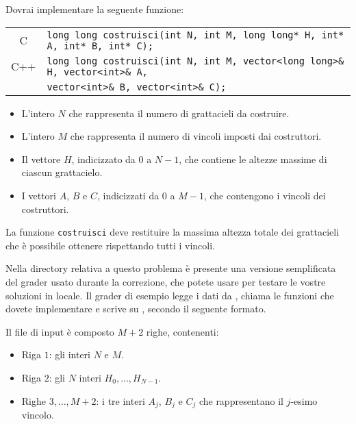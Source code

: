 Dovrai implementare la seguente funzione:

\begin{center}\begin{tabularx}{\textwidth}{|c|X|}
\hline
C  & \verb|long long costruisci(int N, int M, long long* H, int* A, int* B, int* C);|\\
C++ & \verb|long long costruisci(int N, int M, vector<long long>& H, vector<int>& A,|\\
& \hspace{4.25cm}\verb|vector<int>& B, vector<int>& C);|\\
\hline
\end{tabularx}\end{center}

\begin{itemize}[nolistsep]
	\item L'intero $N$ che rappresenta il numero di grattacieli da costruire.
	\item L'intero $M$ che rappresenta il numero di vincoli imposti dai
	      costruttori.
	\item Il vettore $H$, indicizzato da $0$ a $N-1$, che contiene le altezze
	      massime di ciascun grattacielo.
	\item I vettori $A$, $B$ e $C$, indicizzati da $0$ a $M-1$, che contengono i
	      vincoli dei costruttori.
\end{itemize}

\medskip

La funzione \texttt{costruisci} deve restituire la massima altezza totale dei
grattacieli che è possibile ottenere rispettando tutti i vincoli.


\Grader

Nella directory relativa a questo problema è presente una versione semplificata
del grader usato durante la correzione, che potete usare per testare le vostre
soluzioni in locale. Il grader di esempio legge i dati da , chiama
le funzioni che dovete implementare e scrive su \outputfile{}, secondo il
seguente formato.

Il file di input è composto $M+2$ righe, contenenti:
\begin{itemize}[nolistsep,itemsep=2mm]
\item Riga $1$: gli interi $N$ e $M$.
\item Riga $2$: gli $N$ interi $H_0, \dots, H_{N-1}$.
\item Righe $3, \dots, M+2$: i tre interi $A_j$, $B_j$ e $C_j$ che rappresentano il $j$-esimo vincolo.
\end{itemize}

